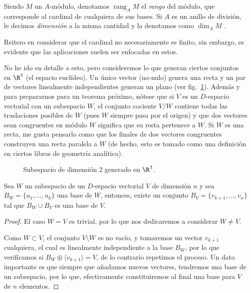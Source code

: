 \documentclass[11pt,oneside]{book}
\DeclareMathOperator{\rang}{rang}
\begin{document}
\begin{mydef}
Siendo $M$ un $A$-módulo, denotamos $\rang_A M$ \nomenclature{$\rang_A M$}{Rango del $A$-módulo $M$} el \textit{rango} del módulo, que corresponde al cardinal de cualquiera de sus bases. Si $A$ es un anillo de división, le decimos \textit{dimensión} a la misma cantidad y la denotamos como $\dim_A M$ .
\end{mydef}
Reitero en considerar que el cardinal no necesariamente es finito, sin embargo, es evidente que las aplicaciones suelen ser enfocadas en estos.

No he ido en detalle a esto, pero consideremos lo que generan ciertos conjuntos en $\R^3$ (el espacio euclídeo). Un único vector (no-nulo) genera una recta y un par de vectores linealmente independientes generan un plano (ver fig.~\ref{fig:plane-generated}). Además y para prepararnos para un teorema próximo, nótese que si $V$ es un $D$-espacio vectorial con un subespacio $W$, el conjunto cociente $V/W$ contiene todas las traslaciones posibles de $W$ (pues $W$ siempre pasa por el origen) y que dos vectores sean congruentes en módulo $W$ significa que su resta pertenece a $W$. Si $W$ es una recta, me gusta pensarlo como que los finales de dos vectores congruentes construyen una recta paralela a $W$ (de hecho, esto es tomado como una definición en ciertos libros de geometría analítica).
\begin{figure}
\centering
{}
\caption{Subespacio de dimensión 2 generado en $\R^3$.}\label{fig:plane-generated}
\end{figure}
\begin{thm}
Sea $W$ un subespacio de un $D$-espacio vectorial $V$ de dimensión $n$ y sea $B_W=\{u_1,\dots,u_k\}$ una base de $W$, entonces, existe un conjunto $B_V=\{v_{k+1},\dots,v_n\}$ tal que $B_W\cup B_V$ es una base de $V$.
\end{thm}
\begin{proof}
El caso $W=V$ es trivial, por lo que nos dedicaremos a considerar $W\neq V$.

Como $W\subset V$, el conjunto $V\setminus W$ es no vacío, y tomaremos un vector $v_{k+1}$ cualquiera, el cual es linealmente independiente a la base $B_W$, por lo que verificamos si $B_W\oplus\langle v_{k+1}\rangle=V$, de lo contrario repetimos el proceso. Un dato importante es que siempre que añadamos nuevos vectores, tendremos una base de un subespacio, por lo que, efectivamente constituiremos al final una base para $V$ de $n$ elementos.
\end{proof}
\end{document}
